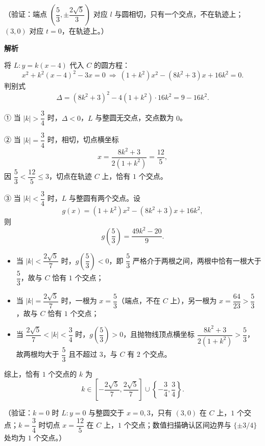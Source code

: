 \begin{answer}
（验证：端点 \(\left(\dfrac53,\pm\dfrac{2\sqrt5}{3}\right)\) 对应 \(l\) 与圆相切，只有一个交点，不在轨迹上；\((3,0)\) 对应 \(t=0\)，在轨迹上。）


\textbf{解析}

将 \(L:y=k(x-4)\) 代入 \(C\) 的圆方程：
\nopagebreak[4]
\[
x^2+k^2(x-4)^2-3x=0
\ \Longrightarrow\
(1+k^2)x^2-(8k^2+3)x+16k^2=0.
\]
判别式
\nopagebreak[4]
\[
\Delta=(8k^2+3)^2-4(1+k^2)\cdot16k^2=9-16k^2.
\]

① 当 \(|k|>\dfrac34\) 时，\(\Delta<0\)，\(L\) 与整圆无交点，交点数为 \(0\)。

② 当 \(|k|=\dfrac34\) 时，相切，切点横坐标
\nopagebreak[4]
\[
x=\frac{8k^2+3}{2(1+k^2)}=\frac{12}{5},
\]
因 \(\dfrac53<\dfrac{12}{5}\leqslant3\)，切点在轨迹 \(C\) 上，恰有 \(1\) 个交点。

③ 当 \(|k|<\dfrac34\) 时，\(L\) 与整圆有两个交点。设
\nopagebreak[4]
\[
g(x)=(1+k^2)x^2-(8k^2+3)x+16k^2,
\]
则
\nopagebreak[4]
\[
g\left(\frac53\right)=\frac{49k^2-20}{9}.
\]
\begin{itemize}
\item 当 \(|k|<\dfrac{2\sqrt5}{7}\) 时，\(g\left(\dfrac53\right)<0\)，即 \(\dfrac53\) 严格介于两根之间，两根中恰有一根大于 \(\dfrac53\)，故与 \(C\) 恰有 \(1\) 个交点；
\item 当 \(|k|=\dfrac{2\sqrt5}{7}\) 时，一根为 \(x=\dfrac53\)（端点，不在 \(C\) 上），另一根为 \(x=\dfrac{64}{23}>\dfrac53\)，故与 \(C\) 恰有 \(1\) 个交点；
\item 当 \(\dfrac{2\sqrt5}{7}<|k|<\dfrac34\) 时，\(g\left(\dfrac53\right)>0\)，且抛物线顶点横坐标 \(\dfrac{8k^2+3}{2(1+k^2)}>\dfrac53\)，故两根均大于 \(\dfrac53\) 且不超过 \(3\)，与 \(C\) 有 \(2\) 个交点。
\end{itemize}

综上，恰有 \(1\) 个交点的 \(k\) 为
\nopagebreak[4]
\[
k\in\left[-\frac{2\sqrt5}{7},\frac{2\sqrt5}{7}\right]\cup\left\{-\frac34,\frac34\right\}.
\]

（验证：\(k=0\) 时 \(L:y=0\) 与整圆交于 \(x=0,3\)，只有 \((3,0)\) 在 \(C\) 上，\(1\) 个交点；\(k=\dfrac34\) 时切点 \(x=\dfrac{12}{5}\) 在 \(C\) 上，\(1\) 个交点；数值扫描确认区间边界与 \(\{ \pm 3/4\}\) 处均为 \(1\) 个交点。）




\end{answer}
